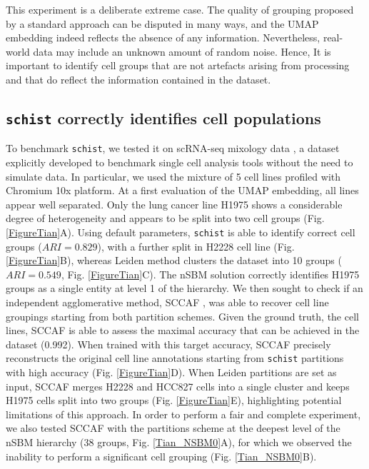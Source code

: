 \documentclass[10pt]{article}
\begin{document}
This experiment is a deliberate extreme case. The quality of grouping proposed by a standard approach can be disputed in many ways, and the UMAP embedding indeed reflects the absence of any information. Nevertheless, real-world data may include an unknown amount of random noise. Hence, It is important to identify cell groups that are not artefacts arising from processing and that do reflect the information contained in the dataset. 

\subsection*{\texttt{schist} correctly identifies cell populations}

To benchmark \texttt{schist}, we tested it on scRNA-seq mixology data \cite{Tian_2019}, a dataset explicitly developed to benchmark single cell analysis tools without the need to simulate data. In particular, we used the mixture of 5 cell lines profiled with Chromium 10x platform. At a first evaluation of the UMAP embedding, all lines appear well separated. Only the lung cancer line H1975 shows a considerable degree of heterogeneity and appears to be split into two cell groups (Fig. \ref{FigureTian}A). Using default parameters, \texttt{schist} is able to identify correct cell groups ($ARI=0.829$), with a further split in H2228 cell line (Fig. \ref{FigureTian}B), whereas Leiden method clusters the dataset into 10 groups ($ARI=0.549$, Fig. \ref{FigureTian}C). The nSBM solution correctly identifies H1975 groups as a single entity at level 1 of the hierarchy. We then sought to check if an independent agglomerative method, SCCAF \cite{miao_2020}, was able to recover cell line groupings starting from both partition schemes. Given the ground truth, the cell lines, SCCAF is able to assess the maximal accuracy that can be achieved in the dataset (0.992). When trained with this target accuracy, SCCAF precisely reconstructs the original cell line annotations starting from \texttt{schist} partitions with high accuracy (Fig. \ref{FigureTian}D). When Leiden partitions are set as input, SCCAF merges H2228 and HCC827 cells into a single cluster and keeps H1975 cells split into two groups (Fig. \ref{FigureTian}E), highlighting potential limitations of this approach. In order to perform a fair and complete experiment, we also tested SCCAF with the partitions scheme at the deepest level of the nSBM hierarchy (38 groups, Fig. \ref{Tian_NSBM0}A), for which we observed the inability to perform a significant cell grouping (Fig. \ref{Tian_NSBM0}B). 
\end{document}
